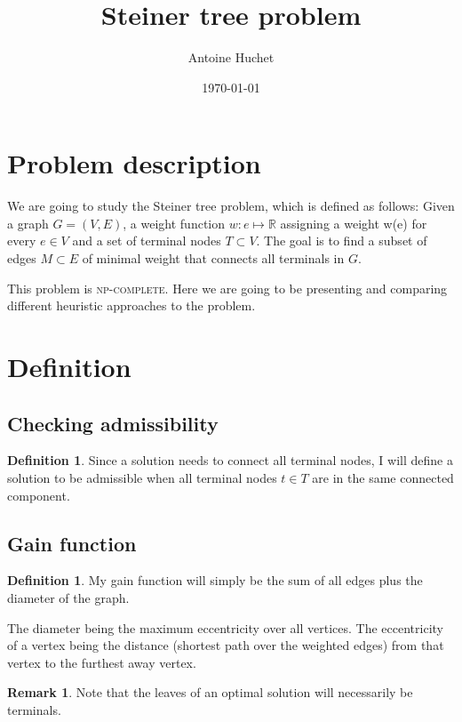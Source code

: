 \documentclass{article}
\title{Steiner tree problem}
\date{\today}
\author{Antoine Huchet}
\theoremstyle{plain} %
\theoremstyle{definition} %
\newtheorem{definition}[theorem]{Definition}
\newtheorem{remark}[theorem]{Remark}
\begin{document}
 \maketitle

\tableofcontents
\newpage

\section{Problem description}

We are going to study the Steiner tree problem, which is defined as
follows: Given a graph $G=(V,E)$, a weight function $w: e \mapsto \mathbb{R}$
assigning a weight w(e) for every $e \in V$  and a set of terminal nodes $T
\subset V$. The goal is to find a subset of edges $M \subset E$ of minimal
weight that connects all terminals in $G$.

This problem is \textsc{np-complete}. Here we are going to be presenting and
comparing different heuristic approaches to the problem.

\section{Definition}

\subsection{Checking admissibility}

\begin{definition}
Since a solution needs to connect all terminal nodes, I will define a solution
to be admissible when all terminal nodes $t \in T$ are in the same connected
component.
\end{definition}

\subsection{Gain function}

\begin{definition}
My gain function will simply be the sum of all edges plus the diameter of the
graph.
\end{definition}

The diameter being the maximum eccentricity over all vertices. The
eccentricity of a vertex being the distance (shortest path over the weighted
edges) from that vertex to the furthest away vertex.

\begin{remark}
Note that the leaves of an optimal solution will necessarily be terminals.
\end{remark}
\end{document}
